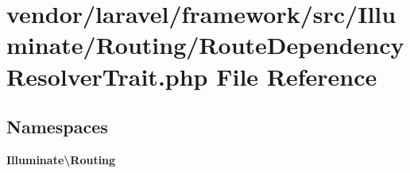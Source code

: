 \section{vendor/laravel/framework/src/\+Illuminate/\+Routing/\+Route\+Dependency\+Resolver\+Trait.php File Reference}
\label{_route_dependency_resolver_trait_8php}
\subsection*{Namespaces}
\begin{DoxyCompactItemize}
\item 
 {\bf Illuminate\textbackslash{}\+Routing}
\end{DoxyCompactItemize}
